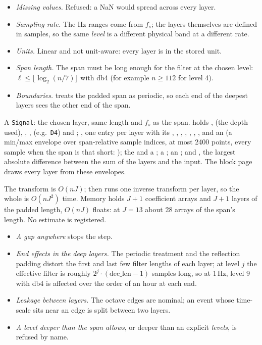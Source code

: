 \begin{itemize}
\item \emph{Missing values.} Refused: a NaN would spread across every layer.
\item \emph{Sampling rate.} The Hz ranges come from $f_s$; the layers themselves are defined
  in samples, so the same \emph{level} is a different physical band at a different rate.
\item \emph{Units.} Linear and not unit-aware: every layer is in the stored unit.
\item \emph{Span length.} The span must be long enough for the filter at the chosen level:
  $\ell \leq \lfloor\log_2(n/7)\rfloor$ with db4 (for example $n \geq 112$ for level 4).
\item \emph{Boundaries.}  treats the padded span as periodic, so each end of the
  deepest layers sees the other end of the span.
\end{itemize}

A \texttt{Signal}: the chosen layer, same length and $f_s$ as the span.  holds
,  (the depth used), , ,
 (e.g.\ \texttt{D4}) and ; , one entry per layer with
its , , , , , ,
,  and an  (a min/max envelope over span-relative sample
indices, at most 2400 points, every sample when the span is that short: ); the
 and a ; a ; an ; and
, the largest absolute difference between the sum of the layers and
the input. The block page draws every layer from these envelopes.

The transform is $O(nJ)$;  then runs one inverse transform per layer, so the
whole is $O(nJ^2)$ time. Memory holds $J+1$ coefficient arrays and $J+1$ layers of the padded
length, $O(nJ)$ floats: at $J = 13$ about 28 arrays of the span's length. No estimate is
registered. 

\begin{itemize}
\item \emph{A gap anywhere} stops the step.
\item \emph{End effects in the deep layers.} The periodic treatment and the reflection padding
  distort the first and last few filter lengths of each layer; at level $j$ the effective
  filter is roughly $2^j\cdot(\mathrm{dec\_len}-1)$ samples long, so at 1\,Hz, level 9 with db4
  is affected over the order of an hour at each end. 
\item \emph{Leakage between layers.} The octave edges are nominal; an event whose time-scale
  sits near an edge is split between two layers.
\item \emph{A level deeper than the span allows}, or deeper than an explicit \emph{levels}, is
  refused by name.
\end{itemize}

